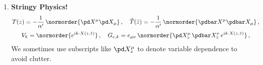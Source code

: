 \documentclass[a4paper,10pt]{article}
\begin{document}
\maketitle
\pagestyle{headings}
\thispagestyle{empty}

	\begin{enumerate}
	\item \textbf{Stringy Physics!}
	\begin{gather}
		T(z)
		= - \frac{1}{\alpha'}\,
			\normorder{\pd X^\mu \pd X_\mu}\,,\quad
		\tilde{T}(\bar{z})
		= - \frac{1}{\alpha'}\,
			\normorder{\pdbar X^\mu \pdbar X_\mu}\,,
	\\[.5ex]
		V_k = \normorder{
				e^{ik\cdot X(z,\bar{z})}
			}\,,\quad
		G_{e,k} = e_{\mu\nu}\,\normorder{
				\pd X^\mu_z\,
				\pdbar X^\nu_{\bar{z}}\,
				e^{ik\cdot X(z,\bar{z})}
			}\,,
	\end{gather}
	We sometimes use subscripts like $
		\pd X^\mu_z
	$ to denote variable dependence to avoid clutter. 
	

\end{enumerate}
\end{document}
